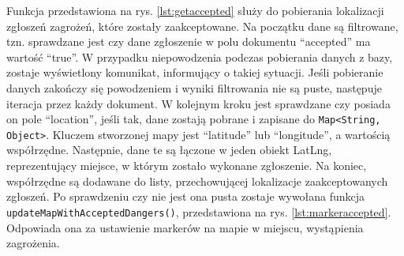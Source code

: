 Funkcja przedstawiona na rys. \ref{lst:getaccepted} służy do pobierania lokalizacji zgłoszeń zagrożeń, które zostały zaakceptowane. Na początku dane są filtrowane, tzn. sprawdzane jest czy dane zgłoszenie w polu dokumentu “accepted” ma wartość “true”. W przypadku niepowodzenia podczas pobierania danych z bazy, zostaje wyświetlony komunikat, informujący o takiej sytuacji. Jeśli pobieranie danych zakończy się powodzeniem i wyniki filtrowania nie są puste, następuje iteracja przez każdy dokument. W kolejnym kroku jest sprawdzane czy posiada on pole “location”, jeśli tak, dane zostają pobrane i zapisane do \verb|Map<String, Object>|. Kluczem stworzonej mapy jest “latitude” lub “longitude”, a wartością współrzędne. Następnie, dane te są łączone w jeden obiekt LatLng, reprezentujący miejsce, w którym zostało wykonane zgłoszenie. Na koniec, współrzędne są dodawane do listy, przechowującej lokalizacje zaakceptowanych zgłoszeń. Po sprawdzeniu czy nie jest ona pusta zostaje wywołana funkcja \verb|updateMapWithAcceptedDangers()|, przedstawiona na rys. \ref{lst:markeraccepted}. Odpowiada ona za ustawienie markerów na mapie w miejscu, wystąpienia zagrożenia. \\

\noindent
\setlength{\fboxrule}{0.5pt}
\begin{minipage}{\linewidth}
    \label{lst:getaccepted}
    \centering
\end{minipage}
\\

\noindent
\setlength{\fboxrule}{0.5pt}
\begin{minipage}{\linewidth}
    \label{lst:markeraccepted}
    \centering
\end{minipage}


